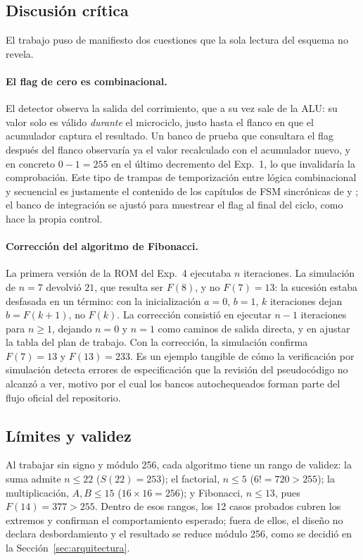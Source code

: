 \documentclass[llncs]{llncs}
\begin{document}
\subsection{Discusión crítica}

El trabajo puso de manifiesto dos cuestiones que la sola lectura del
esquema no revela.

\paragraph{El flag de cero es combinacional.}
El detector observa la salida del corrimiento, que a su vez sale de la
ALU: su valor solo es válido \emph{durante} el microciclo, justo hasta
el flanco en que el acumulador captura el resultado. Un banco de prueba
que consultara el flag después del flanco observaría ya el valor
recalculado con el acumulador nuevo, y en concreto $0 - 1 = 255$ en el
último decremento del Exp.\ 1, lo que invalidaría la comprobación. Este
tipo de trampas de temporización entre lógica combinacional y
secuencial es justamente el contenido de los capítulos de FSM
sincrónicas de \cite{mano2016lcdf} y \cite{harris2015ddca}; el banco de
integración se ajustó para muestrear el flag al final del ciclo, como
hace la propia control.

\paragraph{Corrección del algoritmo de Fibonacci.}
La primera versión de la ROM del Exp.\ 4 ejecutaba $n$ iteraciones. La
simulación de $n=7$ devolvió $21$, que resulta ser $F(8)$, y no
$F(7) = 13$: la sucesión estaba desfasada en un término: con la
inicialización $a=0$, $b=1$, $k$ iteraciones dejan $b = F(k+1)$, no
$F(k)$. La corrección consistió en ejecutar $n-1$ iteraciones para
$n \ge 1$, dejando $n=0$ y $n=1$ como caminos de salida directa, y en
ajustar la tabla del plan de trabajo. Con la corrección, la simulación
confirma $F(7) = 13$ y $F(13) = 233$. Es un ejemplo tangible de cómo la
verificación por simulación detecta errores de especificación que la
revisión del pseudocódigo no alcanzó a ver, motivo por el cual los
bancos autochequeados forman parte del flujo oficial del repositorio.

\subsection{Límites y validez}

Al trabajar sin signo y módulo 256, cada algoritmo tiene un rango de
validez: la suma admite $n \le 22$ ($S(22) = 253$); el factorial,
$n \le 5$ ($6! = 720 > 255$); la multiplicación, $A, B \le 15$
($16 \times 16 = 256$); y Fibonacci, $n \le 13$, pues
$F(14) = 377 > 255$. Dentro de esos rangos, los 12 casos probados
cubren los extremos y confirman el comportamiento esperado; fuera de
ellos, el diseño no declara desbordamiento y el resultado se reduce
módulo 256, como se decidió en la Sección~\ref{sec:arquitectura}.
\end{document}
